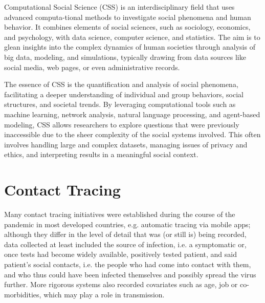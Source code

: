 Computational Social Science (CSS) is an interdisciplinary field that uses advanced computa-tional methods to investigate social phenomena and human behavior. It combines elements of social sciences, such as sociology, economics, and psychology, with data science, computer science, and statistics. The aim is to glean insights into the complex dynamics of human societies through analysis of big data, modeling, and simulations, typically drawing from data sources like social media, web pages, or even administrative records.

The essence of CSS is the quantification and analysis of social phenomena, facilitating a deeper understanding of individual and group behaviors, social structures, and societal trends. By leveraging computational tools such as machine learning, network analysis, natural language processing, and agent-based modeling, CSS allows researchers to explore questions that were previously inaccessible due to the sheer complexity of the social systems involved. This often involves handling large and complex datasets, managing issues of privacy and ethics, and interpreting results in a meaningful social context.

\section{Contact Tracing}
\label{sec:contact_tracing}

Many contact tracing initiatives were established during the course of the pandemic in most developed countries, e.g. automatic tracing via mobile apps; although they differ in the level of detail that was (or still is) being recorded, data collected at least included the source of infection, i.e. a symptomatic or, once tests had become widely available, positively tested patient, and said patient's social contacts, i.e. the people who had come into contact with them, and who thus could have been infected themselves and possibly spread the virus further. More rigorous systems also recorded covariates such as age, job or co-morbidities, which may play a role in transmission. 

